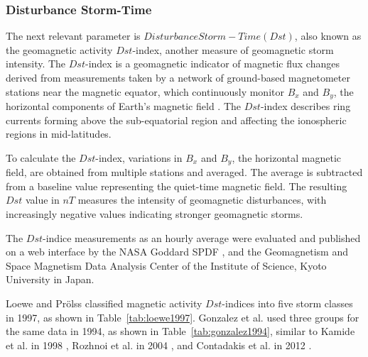 \documentclass[sn-mathphys-num]{sn-jnl}%
\begin{document}
\subsubsection{Disturbance Storm-Time}

The next relevant parameter is $Disturbance Storm-Time (Dst)$, also known as the geomagnetic activity $Dst$-index, another measure of geomagnetic storm intensity. The $Dst$-index is a geomagnetic indicator of magnetic flux changes derived from measurements taken by a network of ground-based magnetometer stations near the magnetic equator, which continuously monitor $B_{x}$ and $B_{y}$, the horizontal components of Earth's magnetic field \cite{zolesi2014ionospheric}. The $Dst$-index describes ring currents forming above the sub-equatorial region and affecting the ionospheric regions in mid-latitudes.

To calculate the $Dst$-index, variations in $B_{x}$ and $B_{y}$, the horizontal magnetic field, are obtained from multiple stations and averaged. The average is subtracted from a baseline value representing the quiet-time magnetic field. The resulting $Dst$ value in $nT$ measures the intensity of geomagnetic disturbances, with increasingly negative values indicating stronger geomagnetic storms. 

The $Dst$-indice measurements as an hourly average were evaluated and published on a web interface by the NASA Goddard SPDF \cite{Papitashvili2024About, Papitashvili2024Explorer}, and the Geomagnetism and Space Magnetism Data Analysis Center of the Institute of Science, Kyoto University in Japan.

Loewe and Prölss \cite{loewe1997classification} classified magnetic activity $Dst$-indices into five storm classes in 1997, as shown in Table~\ref{tab:loewe1997}. Gonzalez et al. \cite{gonzalez1994geomagnetic} used three groups for the same data in 1994, as shown in Table~\ref{tab:gonzalez1994}, similar to Kamide et al. in 1998 \cite{kamide1998two}, Rozhnoi et al. in 2004 \cite{rozhnoi2004middle}, and Contadakis et al. in 2012 \cite{contadakis2012total}.
\end{document}
